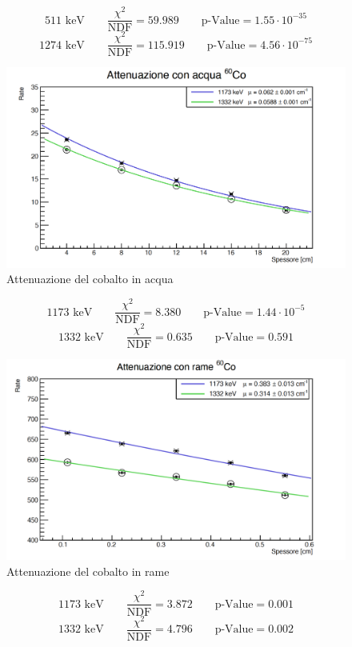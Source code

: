 \documentclass[a4paper,10pt]{article}
\newcommand*{\unit}[1]{\ensuremath{\mathrm{\,#1}}}
\begin{document}
$$
	511\, \unit{keV} \qquad \frac{\chi^2}{\textrm{NDF}}   = 59.989 \qquad \textrm{p-Value} = 1.55\cdot 10^{-35}
$$
$$
	1274\, \unit{keV} \qquad \frac{\chi^2}{\textrm{NDF}}   = 115.919 \qquad \textrm{p-Value} = 4.56\cdot 10^{-75}
$$
\begin{figure}[H]
    \centering
    \includegraphics[scale=0.45]{grafici/attenuazionecobaltoacqua}
    \caption{Attenuazione del cobalto in acqua}
\end{figure}
$$
	1173\, \unit{keV} \qquad \frac{\chi^2}{\textrm{NDF}}  = 8.380 \qquad \textrm{p-Value} = 1.44\cdot 10^{-5}
$$
$$
	1332\, \unit{keV} \qquad \frac{\chi^2}{\textrm{NDF}}  = 0.635 \qquad \textrm{p-Value} = 0.591
$$
\begin{figure}[H]
    \centering
    \includegraphics[scale=0.45]{grafici/attenuazionecobaltorame}
    \caption{Attenuazione del cobalto in rame}
\end{figure}
$$
	1173\, \unit{keV} \qquad \frac{\chi^2}{\textrm{NDF}}   = 3.872 \qquad \textrm{p-Value} = 0.001
$$
$$
	1332\, \unit{keV} \qquad \frac{\chi^2}{\textrm{NDF}}   = 4.796 \qquad \textrm{p-Value} = 0.002
$$
\end{document}
